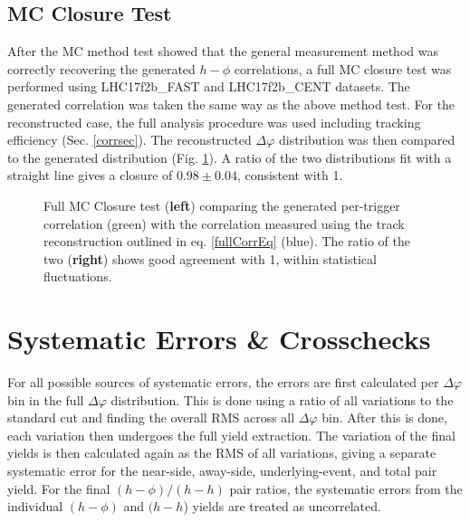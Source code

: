 \documentclass[ALICE,manyauthors]{ALICE_analysis_notes}
\begin{document}
\begin{itemize}
\subsection{MC Closure Test}

After the MC method test showed that the general measurement method was correctly recovering the generated $h-\phi$ correlations, a full MC closure test was performed using LHC17f2b\_FAST and LHC17f2b\_CENT datasets.  The generated correlation was taken the same way as the above method test.  For the reconstructed case, the full analysis procedure was used including tracking efficiency (Sec. \ref{corrsec}).  The reconstructed $\Delta\varphi$ distribution was then compared to the generated distribution (Fig. \ref{MCClosureFAST}).  A ratio of the two distributions fit with a straight line gives a closure of $0.98\pm 0.04$, consistent with 1.

\begin{figure}[ht]
\centering
\begin{subfigure}{
\texttt{[image: images/truevsrecon\_notrigger.pdf]}}
\end{subfigure}
\begin{subfigure}{
\texttt{[image: images/ratio\_recon-true\_notrigger.pdf]}}
\end{subfigure}
\caption{Full MC Closure test (\textbf{left}) comparing the generated per-trigger correlation (green) with the correlation measured using the track reconstruction outlined in eq. \ref{fullCorrEq} (blue). The ratio of the two (\textbf{right}) shows good agreement with 1, within statistical fluctuations.}
\label{MCClosureFAST}
\end{figure}


\section{Systematic Errors \& Crosschecks}


For all possible sources of systematic errors, the errors are first calculated per $\Delta\varphi$ bin in the full $\Delta\varphi$ distribution.  This is done using a ratio of all variations to the standard cut and finding the overall RMS across all $\Delta\varphi$ bin. After this is done, each variation then undergoes the full yield extraction.  The variation of the final yields is then calculated again as the RMS of all variations, giving a separate systematic error for the near-side, away-side, underlying-event, and total pair yield.  For the final $(h-\phi)/(h-h)$ pair ratios, the systematic errors from the individual $(h-\phi)$ and $(h-h$) yields are treated as uncorrelated.


\end{itemize}
\end{document}
